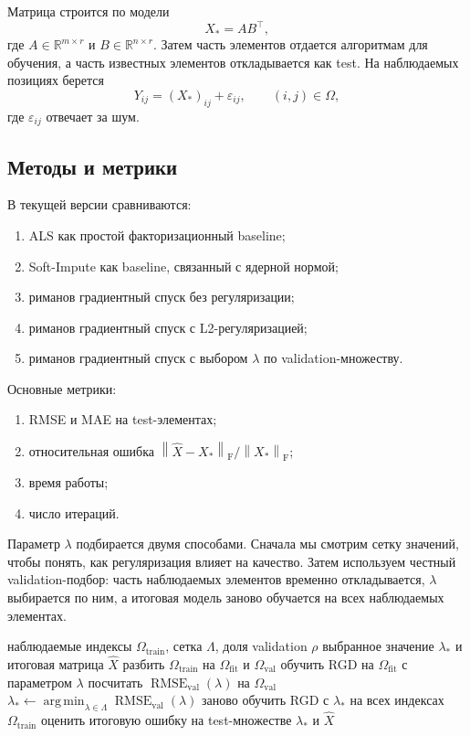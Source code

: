 \documentclass[a4paper,12pt]{article}
\newcommand{\R}{\mathbb{R}}
\newcommand{\fro}[1]{\left\lVert #1 \right\rVert_{\mathrm F}}
\newcommand{\argmin}{\operatorname*{arg\,min}}
\begin{document}
Матрица строится по модели
\[
    X_* = AB^\top,
\]
где $A\in\R^{m\times r}$ и $B\in\R^{n\times r}$. Затем часть элементов отдается алгоритмам для обучения, а часть известных элементов откладывается как test. На наблюдаемых позициях берется
\[
    Y_{ij}=(X_*)_{ij}+\varepsilon_{ij}, \qquad (i,j)\in\Omega,
\]
где $\varepsilon_{ij}$ отвечает за шум.

\subsection{Методы и метрики}

В текущей версии сравниваются:
\begin{enumerate}[label=\arabic*.]
    \item ALS как простой факторизационный baseline;
    \item Soft-Impute как baseline, связанный с ядерной нормой;
    \item риманов градиентный спуск без регуляризации;
    \item риманов градиентный спуск с L2-регуляризацией;
    \item риманов градиентный спуск с выбором $\lambda$ по validation-множеству.
\end{enumerate}

Основные метрики:
\begin{enumerate}[label=\arabic*.]
    \item RMSE и MAE на test-элементах;
    \item относительная ошибка $\fro{\widehat X-X_*}/\fro{X_*}$;
    \item время работы;
    \item число итераций.
\end{enumerate}

Параметр $\lambda$ подбирается двумя способами. Сначала мы смотрим сетку значений, чтобы понять, как регуляризация влияет на качество. Затем используем честный validation-подбор: часть наблюдаемых элементов временно откладывается, $\lambda$ выбирается по ним, а итоговая модель заново обучается на всех наблюдаемых элементах.

\begin{algorithm}[H]
    \caption{Validation-подбор параметра $\lambda$}
    \label{alg:validation-lambda-final}
    \begin{algorithmic}[1]
        \Require наблюдаемые индексы $\Omega_{\mathrm{train}}$, сетка $\Lambda$, доля validation $\rho$
        \Ensure выбранное значение $\lambda_*$ и итоговая матрица $\widehat X$
        \State разбить $\Omega_{\mathrm{train}}$ на $\Omega_{\mathrm{fit}}$ и $\Omega_{\mathrm{val}}$
        \For{$\lambda\in\Lambda$}
        \State обучить RGD на $\Omega_{\mathrm{fit}}$ с параметром $\lambda$
        \State посчитать $\operatorname{RMSE}_{\mathrm{val}}(\lambda)$ на $\Omega_{\mathrm{val}}$
        \EndFor
        \State $\lambda_*\gets \argmin_{\lambda\in\Lambda}\operatorname{RMSE}_{\mathrm{val}}(\lambda)$
        \State заново обучить RGD с $\lambda_*$ на всех индексах $\Omega_{\mathrm{train}}$
        \State оценить итоговую ошибку на test-множестве
        \State \Return $\lambda_*$ и $\widehat X$
    \end{algorithmic}
\end{algorithm}
\end{document}
